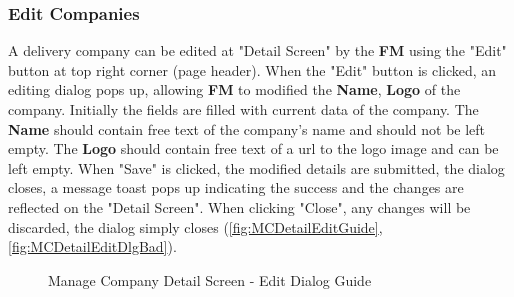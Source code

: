\subsubsection{Edit Companies}

A delivery company can be edited at "Detail Screen" by the \textbf{FM} using the "Edit" button at top right corner (page header). 
When the "Edit" button is clicked, an editing dialog pops up, allowing \textbf{FM} to modified the \textbf{Name}, \textbf{Logo} of the company. Initially the fields are filled with current data of the company. The \textbf{Name} should contain free text of the company's name and should not be left empty. The \textbf{Logo} should contain free text of a url to the logo image and can be left empty.
When "Save" is clicked, the modified details are submitted, the dialog closes, a message toast pops up indicating the success and the changes are reflected on the "Detail Screen". When clicking "Close", any changes will be discarded, the dialog simply closes (\autoref{fig:MCDetailEditGuide}, \autoref{fig:MCDetailEditDlgBad}). 

\begin{figure}[H]
	\centering
    \vspace{5pt}
    \hspace{5pt}
    \caption{Manage Company Detail Screen - Edit Dialog Guide}
	\label{fig:MCDetailEditGuide}
\end{figure}

